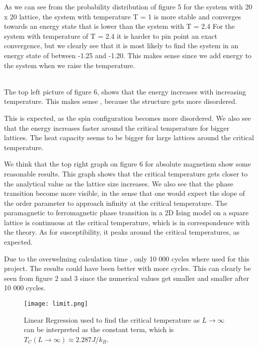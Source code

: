 \documentclass{article}
\begin{document}
As we can see from the probability distribution of figure 5 for the system with 20 x 20 lattice, the system with temperature T = 1 is more stable and converges towards an energy state that is lower than the system with T = 2.4 For the system with temperature of T = 2.4 it is harder to pin point an exact convergence, but we clearly see that it is most likely to find the system in an energy state of between -1.25 and -1.20. This makes sense since we add energy to the system when we raise the temperature.\\\



The top left picture of figure 6, shows that the energy increases with increasing temperature. This makes sense , because the structure gets more disordered.

This is expected, as the spin configuration becomes more disordered. We also see that the energy increases faster around the critical temperature for bigger lattices. The heat capacity seems to be bigger for large lattices around the critical temperature.

We think that the top right graph on figure 6 for absolute magnetism  show some reasonable results. This graph shows  that the critical temperature gets closer to the analytical value as the lattice size increases. We also see that the phase transition become more visible, in the sense that one would expect the slope of the order parameter to approach infinity at the critical temperature. The paramagnetic to ferromagnetic phase transition in a 2D Ising model on a square lattice is continuous at the critical temperature, which is in correspondence with the theory. As for susceptibility, it peaks around the critical temperatures, as expected.


Due to the overwelming calculation time , only 10 000 cycles where used for this project. The results could have been better with more cycles. This can clearly be seen from figure 2 and 3 since the numerical values get smaller and smaller after 10 000 cycles. 



\begin{figure}[H]
	\centering
	\texttt{[image: limit.png]}
	\centering
	\caption{Linear Regression used to find the critical temperature as $L \to \infty$ can be interpreted as the constant term, which is $T_C(L\to\infty) \approx 2.287 J/k_B$. }
	\label{fig: integration limits Gauss-Legendre}
\end{figure}
\end{document}
